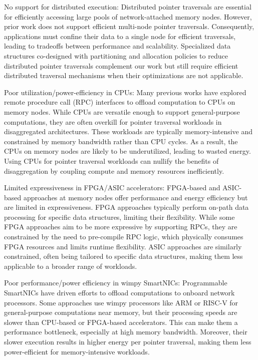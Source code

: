 No support for distributed execution: Distributed pointer traversals are essential for efficiently accessing large pools of network-attached memory nodes. However, prior work does not support efficient multi-node pointer traversals. Consequently, applications must confine their data to a single node for efficient traversals, leading to tradeoffs between performance and scalability. Specialized data structures co-designed with partitioning and allocation policies to reduce distributed pointer traversals complement our work but still require efficient distributed traversal mechanisms when their optimizations are not applicable.

Poor utilization/power-efficiency in CPUs: Many previous works have explored remote procedure call (RPC) interfaces to offload computation to CPUs on memory nodes. While CPUs are versatile enough to support general-purpose computations, they are often overkill for pointer traversal workloads in disaggregated architectures. These workloads are typically memory-intensive and constrained by memory bandwidth rather than CPU cycles. As a result, the CPUs on memory nodes are likely to be underutilized, leading to wasted energy. Using CPUs for pointer traversal workloads can nullify the benefits of disaggregation by coupling compute and memory resources inefficiently.

Limited expressiveness in FPGA/ASIC accelerators: FPGA-based and ASIC-based approaches at memory nodes offer performance and energy efficiency but are limited in expressiveness. FPGA approaches typically perform on-path data processing for specific data structures, limiting their flexibility. While some FPGA approaches aim to be more expressive by supporting RPCs, they are constrained by the need to pre-compile RPC logic, which physically consumes FPGA resources and limits runtime flexibility. ASIC approaches are similarly constrained, often being tailored to specific data structures, making them less applicable to a broader range of workloads.

Poor performance/power efficiency in wimpy SmartNICs: Programmable SmartNICs have driven efforts to offload computations to onboard network processors. Some approaches use wimpy processors like ARM or RISC-V for general-purpose computations near memory, but their processing speeds are slower than CPU-based or FPGA-based accelerators. This can make them a performance bottleneck, especially at high memory bandwidth. Moreover, their slower execution results in higher energy per pointer traversal, making them less power-efficient for memory-intensive workloads.


